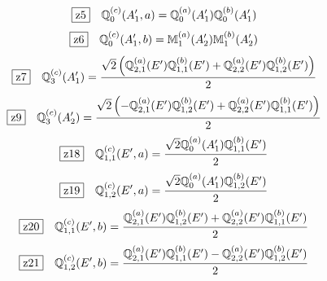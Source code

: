 \documentclass[fleqn,10pt,landscape]{jsarticle}
\begin{document}
\begin{dmath*}
\hspace*{3mm}\fbox{z5}\quad \mathbb{Q}_{0}^{(c)}(A_{1}^{\prime},a)=\mathbb{Q}_{0}^{(a)}(A_{1}^{\prime}) \mathbb{Q}_{0}^{(b)}(A_{1}^{\prime})
\end{dmath*}
\begin{dmath*}
\hspace*{3mm}\fbox{z6}\quad \mathbb{Q}_{0}^{(c)}(A_{1}^{\prime},b)=\mathbb{M}_{1}^{(a)}(A_{2}^{\prime}) \mathbb{M}_{1}^{(b)}(A_{2}^{\prime})
\end{dmath*}
\begin{dmath*}
\hspace*{3mm}\fbox{z7}\quad \mathbb{Q}_{3}^{(c)}(A_{1}^{\prime})=\frac{\sqrt{2} \left(\mathbb{Q}_{2,1}^{(a)}(E^{\prime}) \mathbb{Q}_{1,1}^{(b)}(E^{\prime}) + \mathbb{Q}_{2,2}^{(a)}(E^{\prime}) \mathbb{Q}_{1,2}^{(b)}(E^{\prime})\right)}{2}
\end{dmath*}
\begin{dmath*}
\hspace*{3mm}\fbox{z9}\quad \mathbb{Q}_{3}^{(c)}(A_{2}^{\prime})=\frac{\sqrt{2} \left(- \mathbb{Q}_{2,1}^{(a)}(E^{\prime}) \mathbb{Q}_{1,2}^{(b)}(E^{\prime}) + \mathbb{Q}_{2,2}^{(a)}(E^{\prime}) \mathbb{Q}_{1,1}^{(b)}(E^{\prime})\right)}{2}
\end{dmath*}
\begin{dmath*}
\hspace*{3mm}\fbox{z18}\quad \mathbb{Q}_{1,1}^{(c)}(E^{\prime},a)=\frac{\sqrt{2} \mathbb{Q}_{0}^{(a)}(A_{1}^{\prime}) \mathbb{Q}_{1,1}^{(b)}(E^{\prime})}{2}
\end{dmath*}
\begin{dmath*}
\hspace*{3mm}\fbox{z19}\quad \mathbb{Q}_{1,2}^{(c)}(E^{\prime},a)=\frac{\sqrt{2} \mathbb{Q}_{0}^{(a)}(A_{1}^{\prime}) \mathbb{Q}_{1,2}^{(b)}(E^{\prime})}{2}
\end{dmath*}
\begin{dmath*}
\hspace*{3mm}\fbox{z20}\quad \mathbb{Q}_{1,1}^{(c)}(E^{\prime},b)=\frac{\mathbb{Q}_{2,1}^{(a)}(E^{\prime}) \mathbb{Q}_{1,2}^{(b)}(E^{\prime}) + \mathbb{Q}_{2,2}^{(a)}(E^{\prime}) \mathbb{Q}_{1,1}^{(b)}(E^{\prime})}{2}
\end{dmath*}
\begin{dmath*}
\hspace*{3mm}\fbox{z21}\quad \mathbb{Q}_{1,2}^{(c)}(E^{\prime},b)=\frac{\mathbb{Q}_{2,1}^{(a)}(E^{\prime}) \mathbb{Q}_{1,1}^{(b)}(E^{\prime}) - \mathbb{Q}_{2,2}^{(a)}(E^{\prime}) \mathbb{Q}_{1,2}^{(b)}(E^{\prime})}{2}
\end{dmath*}
\end{document}
